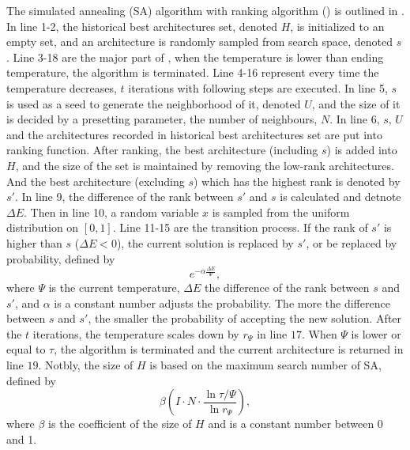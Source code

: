 \documentclass[sigconf]{acmart}
\begin{document}
    The simulated annealing (SA) algorithm with ranking algorithm (\palg{})
    is outlined in . In line 1-2, the historical best architectures 
    set, denoted $H$, is initialized to an empty set, and an architecture is randomly sampled from 
    search space, denoted $s$. Line 3-18 are the major part of \palg{}, when the temperature 
    is lower than ending temperature, the algorithm is terminated. Line 4-16 
    represent every time the temperature decreases, $t$ iterations with following steps are executed. 
    In line 5, $s$ is used as a seed to generate the neighborhood of it, denoted $U$, 
    and the size of it is decided by a presetting parameter, the number of neighbours, $N$. 
    In line 6, $s$, $U$ and the architectures recorded in historical best architectures set are 
    put into ranking function. 
    After ranking, the best architecture (including $s$) is added into $H$, and the size of the set is 
    maintained by removing the low-rank architectures. 
    And the best architecture (excluding $s$) which has the highest rank is denoted by $s'$. 
    In line 9, the difference of the rank between $s'$ and $s$ is calculated and detnote $\Delta E$. 
    Then in line 10, a random variable $x$ is sampled from the uniform distribution on $[0,1]$. 
    Line 11-15 are the transition process. If the rank of $s'$ is higher than $s$ ($\Delta E<0$), 
    the current solution is replaced by $s'$, or be replaced by probability, defined by 
    \begin{equation} 
        \label{equ:SA_rk_prob}
        e^{-\alpha\frac{\Delta E}{\Psi}},
    \end{equation}
    where $\Psi$ is the current temperature, $\Delta E$ the difference of the rank between 
    $s$ and $s'$, and $\alpha$ is a constant number adjusts the probability. The more 
    the difference between $s$ and $s'$, the smaller the probability of accepting the new solution. 
    After the $t$ iterations, the temperature scales down by $r_\Psi$ in line $17$. When $\Psi$ is 
    lower or equal to $\tau$, the algorithm is terminated and the current architecture is returned in line $19$. 
    Notbly, the size of $H$ is based on the maximum search number of SA, defined by 
    \begin{equation}
        \label{equ:SA_rk_size_of_H}
        \beta (I\cdot N\cdot\frac{\ln{\tau/\Psi}}{\ln{r_\Psi}}),
    \end{equation}
    where $\beta$ is the coefficient of the size of $H$ and is a constant number between 0 and 1.
\end{document}
